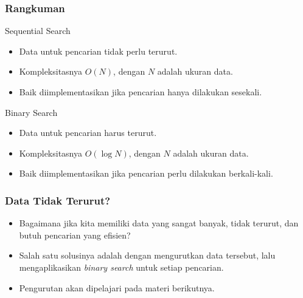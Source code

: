 \begin{frame}
\frametitle{Rangkuman}
\begin{block}{Sequential Search}
\begin{itemize}
  \item Data untuk pencarian tidak perlu terurut.
  \item Kompleksitasnya $O(N)$, dengan $N$ adalah ukuran data.
  \item Baik diimplementasikan jika pencarian hanya dilakukan sesekali.
\end{itemize}
\end{block}

\vfill
\begin{block}{Binary Search}
\begin{itemize}
  \item Data untuk pencarian harus terurut.
  \item Kompleksitasnya $O(\log{N})$, dengan $N$ adalah ukuran data.
  \item Baik diimplementasikan jika pencarian perlu dilakukan berkali-kali.
\end{itemize}
\end{block}
\end{frame}

\begin{frame}
\frametitle{Data Tidak Terurut?}
\begin{itemize}
  \item Bagaimana jika kita memiliki data yang sangat banyak, tidak terurut, dan butuh pencarian yang efisien?
  \item Salah satu solusinya adalah dengan \alert{mengurutkan} data tersebut, lalu mengaplikasikan \textit{binary search} untuk setiap pencarian.
  \item Pengurutan akan dipelajari pada materi berikutnya.
\end{itemize}
\end{frame}


